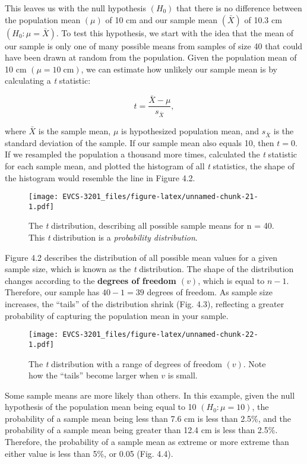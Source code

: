 \documentclass[]{book}
\begin{document}
This leaves us with the null hypothesis \((H_0)\) that there is no
difference between the population mean \((\mu)\) of 10 cm and our sample
mean \((\bar{X})\) of 10.3 cm \((H_0: \mu = \bar{X})\). To test this
hypothesis, we start with the idea that the mean of our sample is only
one of many possible means from samples of size 40 that could have been
drawn at random from the population. Given the population mean of 10 cm
\((\mu = 10\;\textrm{cm})\), we can estimate how unlikely our sample
mean is by calculating a \emph{t} statistic:

\[t = \frac{\bar{X}-\mu}{s_{\bar{X}}} ,\]

where \(\bar{X}\) is the sample mean, \(\mu\) is hypothesized population
mean, and \(s_{\bar{X}}\) is the standard deviation of the sample. If
our sample mean also equals 10, then \(t = 0\). If we resampled the
population a thousand more times, calculated the \emph{t} statistic for
each sample mean, and plotted the histogram of all \emph{t} statistics,
the shape of the histogram would resemble the line in Figure 4.2.

\begin{figure}
\centering
\texttt{[image: EVCS-3201\_files/figure-latex/unnamed-chunk-21-1.pdf]}
\caption{\label{fig:unnamed-chunk-21}The \emph{t} distribution, describing
all possible sample means for n = 40. This \emph{t} distribution is a
\emph{probability distribution}.}
\end{figure}

Figure 4.2 describes the distribution of all possible mean values for a
given sample size, which is known as the \emph{t} distribution. The
shape of the distribution changes according to the \textbf{degrees of
freedom \((v)\)}, which is equal to \(n - 1\). Therefore, our sample has
\(40-1 = 39\) degrees of freedom. As sample size increases, the
``tails'' of the distribution shrink (Fig. 4.3), reflecting a greater
probability of capturing the population mean in your sample.

\begin{figure}
\centering
\texttt{[image: EVCS-3201\_files/figure-latex/unnamed-chunk-22-1.pdf]}
\caption{\label{fig:unnamed-chunk-22}The \emph{t} distribution with a range
of degrees of freedom \((v)\). Note how the ``tails'' become larger when
\(v\) is small.}
\end{figure}

Some sample means are more likely than others. In this example, given
the null hypothesis of the population mean being equal to 10
\((H_0: \mu = 10)\), the probability of a sample mean being less than
7.6 cm is less than 2.5\%, and the probability of a sample mean being
greater than 12.4 cm is less than 2.5\%. Therefore, the probability of a
sample mean as extreme or more extreme than either value is less than
5\%, or 0.05 (Fig. 4.4).
\end{document}
